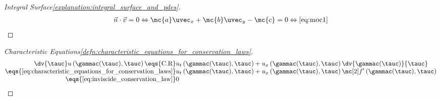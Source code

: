\begin{proofbox}\nospacing
    \begin{proof}[Integral Surface\cref{explanation:integral_surface_and_pdes}]\label{proof:explanation:integral_surface_and_pdes}
        \begin{align}
            \vec{n}\cdot\vec{v}=0\Leftrightarrow\mc{a}\uvec_x+\mc{b}\uvec_y-\mc{c}=0\Leftrightarrow\cref{eq:moc1}
        \end{align}
    \end{proof}
\end{proofbox}
\begin{proofbox}\nospacing
    \begin{proof}[Characteristic Equations\cref{defn:characteristic_equations_for_conservation_laws}]
        \label{proof:defn:characteristic_equations_for_conservation_laws}\leavevmode\\
        \begin{align*}
          \dv{\tauc}u \left(\gammac(\tauc),\tauc\right)
          \eqs{\text{C.R}}&u_{t}\left(\gammac(\tauc),\tauc\right)+u_{x}\left(\gammac(\tauc),\tauc\right)\dv{\gammac(\tauc)}{\tauc} \\[-1\jot]
        \eqs{\text{\cref{eq:characteristic_equations_for_conservation_laws}}}&
        u_{t}\left(\gammac(\tauc),\tauc\right)+u_{x}\left(\gammac(\tauc),\tauc\right)\flux'\left(\gammac(\tauc),\tauc\right)\\[-1\jot]
        \eqs{\text{\cref{eq:inviscide_conservation_law}}}&0
        \end{align*}
    \end{proof}
\end{proofbox}
